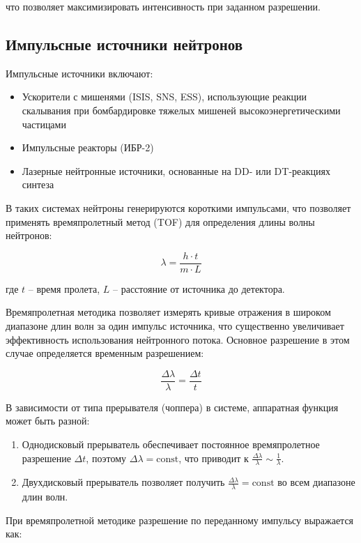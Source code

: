 \documentclass[a4paper]{article}
\begin{document}
что позволяет максимизировать интенсивность при заданном разрешении.

\subsection{Импульсные источники нейтронов}
Импульсные источники включают:
\begin{itemize}
    \item Ускорители с мишенями (ISIS, SNS, ESS), использующие реакции скалывания при бомбардировке тяжелых мишеней высокоэнергетическими частицами 
    \item Импульсные реакторы (ИБР-2) 
    \item Лазерные нейтронные источники, основанные на DD- или DT-реакциях синтеза 
\end{itemize}

В таких системах нейтроны генерируются короткими импульсами, что позволяет применять времяпролетный метод (TOF) для определения длины волны нейтронов:

\begin{equation}
\lambda = \frac{h \cdot t}{m \cdot L}
\end{equation}

где $t$ -- время пролета, $L$ -- расстояние от источника до детектора.

Времяпролетная методика позволяет измерять кривые отражения в широком диапазоне длин волн за один импульс источника, что существенно увеличивает эффективность использования нейтронного потока. Основное разрешение в этом случае определяется временным разрешением:

\begin{equation}
\frac{\Delta\lambda}{\lambda} = \frac{\Delta t}{t}
\end{equation}

В зависимости от типа прерывателя (чоппера) в системе, аппаратная функция может быть разной:
\begin{enumerate}
    \item Однодисковый прерыватель обеспечивает постоянное времяпролетное разрешение $\Delta t$, поэтому $\Delta\lambda = \text{const}$, что приводит к $\frac{\Delta\lambda}{\lambda} \sim \frac{1}{\lambda}$. 
    \item Двухдисковый прерыватель позволяет получить $\frac{\Delta\lambda}{\lambda} = \text{const}$ во всем диапазоне длин волн. 
\end{enumerate}

При времяпролетной методике разрешение по переданному импульсу выражается как:
\end{document}
